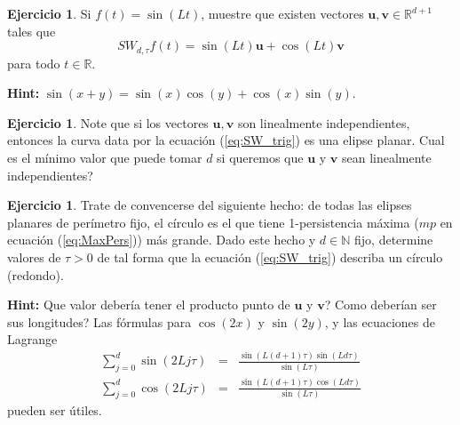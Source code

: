 \documentclass[12pt,reqno,oneside]{article}
\theoremstyle{definition}
\newtheorem{pregunta}[theorem]{Ejercicio}
\begin{document}
\begin{pregunta}
    Si $f(t) = \sin(Lt)$, muestre que existen vectores $\mathbf{u,v} \in \mathbb{R}^{d+1}$  tales que
    \begin{equation}\label{eq:SW_trig}
    SW_{d,\tau} f(t) = \sin(Lt)\mathbf{u} + \cos(Lt) \mathbf{v}
    \end{equation}
    para todo $t\in \mathbb{R}$. 
    
    \noindent \textbf{Hint:} 
    $\sin(x + y) = \sin(x)\cos(y) + \cos(x)\sin(y)$.
\end{pregunta}

\begin{pregunta}
	Note que si los vectores $\mathbf{u,v}$ son linealmente independientes, entonces la curva  data por la ecuaci\'on (\ref{eq:SW_trig}) es una elipse planar. Cual es el m\'inimo valor que puede tomar $d$ si queremos que $\mathbf{u}$ y $\mathbf{v}$ sean linealmente independientes?
\end{pregunta}
\begin{pregunta}
    Trate de convencerse del siguiente hecho: de todas las elipses planares de per\'imetro fijo, el c\'irculo es el que tiene  1-persistencia m\'axima ($mp$ en ecuaci\'on (\ref{eq:MaxPers})) m\'as grande. 
    Dado este hecho y $d\in \mathbb{N}$ fijo, determine valores de $\tau > 0$
    de tal forma que la ecuaci\'on (\ref{eq:SW_trig}) describa un c\'irculo (redondo).
    
    \noindent \textbf{Hint:} Que valor deber\'ia tener el producto punto de $\mathbf{u}$ y $\mathbf{v}$? Como deber\'ian ser sus longitudes? 
    Las f\'ormulas  para $\cos(2x)$ y $\sin(2y)$, y  las ecuaciones de Lagrange
    \begin{eqnarray*}
    \sum_{j = 0 }^d \sin(2Lj\tau) &=& \frac{\sin(L(d+1)\tau)\sin(Ld\tau)}{\sin(L\tau)} \\
        \sum_{j = 0 }^d \cos(2Lj\tau) &=& \frac{\sin(L(d+1)\tau)\cos(Ld\tau)}{\sin(L\tau)}
    \end{eqnarray*}
    pueden ser \'utiles. 
\end{pregunta}
\end{document}
